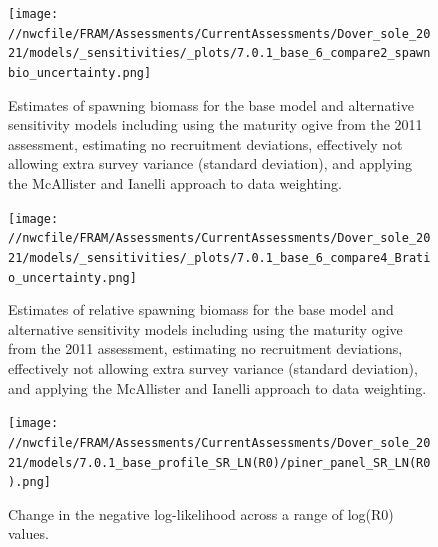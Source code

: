 \documentclass[11pt,
  english,
  a4paper,
]{article}
\begin{document}
\tagmcend\tagstructend


\begin{figure}
\centering
\texttt{[image: //nwcfile/FRAM/Assessments/CurrentAssessments/Dover\_sole\_2021/models/\_sensitivities/\_plots/7.0.1\_base\_6\_compare2\_spawnbio\_uncertainty.png]}
\caption{Estimates of spawning biomass for the base model and alternative sensitivity models including using the maturity ogive from the 2011 assessment, estimating no recruitment deviations, effectively not allowing extra survey variance (standard deviation), and applying the McAllister and Ianelli approach to data weighting.\label{fig:sens-biodata-ssb}}
\end{figure}

\tagmcend\tagstructend


\begin{figure}
\centering
\texttt{[image: //nwcfile/FRAM/Assessments/CurrentAssessments/Dover\_sole\_2021/models/\_sensitivities/\_plots/7.0.1\_base\_6\_compare4\_Bratio\_uncertainty.png]}
\caption{Estimates of relative spawning biomass for the base model and alternative sensitivity models including using the maturity ogive from the 2011 assessment, estimating no recruitment deviations, effectively not allowing extra survey variance (standard deviation), and applying the McAllister and Ianelli approach to data weighting.\label{fig:sens-biodata-relssb}}
\end{figure}

\tagmcend\tagstructend


\begin{figure}
\centering
\texttt{[image: //nwcfile/FRAM/Assessments/CurrentAssessments/Dover\_sole\_2021/models/7.0.1\_base\_profile\_SR\_LN(R0)/piner\_panel\_SR\_LN(R0).png]}
\caption{Change in the negative log-likelihood across a range of log(R0) values.\label{fig:r0-profile}}
\end{figure}
\end{document}
